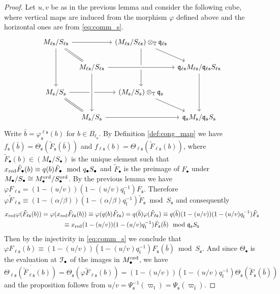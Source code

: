 \documentclass[leqno]{amsart}
\theoremstyle{definition}
\theoremstyle{remark}
\newcommand{\fl}{\mathfrak{l}}
\newcommand{\fq}{\mathfrak{q}}
\newcommand{\fs}{\mathfrak{s}}
\newcommand{\xx}{x_\textnormal{red}}
\newcommand{\TT}{\mathbb{T}} %
\newcommand{\euF}{\EuScript{F}} %
\newcommand{\ord}{\textnormal{ord}} %
\begin{document}
\begin{proof}

Let $u,v$ be as in the previous lemma 
and consider the following cube,
where vertical maps are induced from 
the morphism $\varphi$ defined above
and the horizontal ones are from \eqref{eq:comm_s}.
\begin{equation*}
\begin{tikzcd}[column sep=tiny]
M_{\ell\fs}/S_{\ell\fs}\arrow{dd} \arrow[rd,equal]\arrow[rr]
&& (M_{\ell\fs}/S_{\ell\fs})\otimes_{\TT}\fq_{\ell\fs}
	\arrow[rd]\arrow[dd]\\
& M_{\ell\fs}/S_{\ell\fs}
	\arrow[crossing over]{dd} \arrow[crossing over]{rr} 
&& \fq_{\ell\fs}M_{\ell\fs}/\fq_{\ell\fs}S_{\ell\fs}
	\arrow[crossing over]{dd}\\
M_{\fs}/S_{\fs}\arrow{rr}\arrow[rd,equal]
&& (M_{\fs}/S_{\fs})\otimes_{\TT} \fq_{\fs}
	\arrow[rd]\\
& M_{\fs}/S_{\fs} \arrow[crossing over]{rr} 
&& \fq_{\fs}M_{\fs}/\fq_{\fs}S_{\fs}
\arrow[from=2-2,to=4-2,crossing over]
\arrow[from=2-4,to=4-4,crossing over]
\end{tikzcd}
\end{equation*}
Write $\bar{b}=\varphi^{\ell\fs}_{\fs}(b)$
for $b\in B_{\ell_\fs}$.
By Definition \ref{def:cong_map} we have
$f_\fs(\bar{b})=\Theta_{\fs}(\tilde{F}_\fs(\bar{b}))$ and 
$f_{\ell\fs}(b)=\Theta_{\ell\fs}(\tilde{F}_{\ell\fs}(b))$,
where $\tilde{F}_\bullet(b)\in (M_\bullet/S_\bullet)$
is the unique element such that 
$\xx \tilde{F}_\bullet(b)\equiv 
q(b)\tilde{F}_\bullet\mod q_\bullet S_\bullet$
and $\tilde{F}_\bullet$ is the preimage 
of $F_\bullet$ under 
$M_\bullet/S_\bullet\cong M_\bullet^{\ord}/S_\bullet^{\ord}$.
By the previous lemma we have
$\varphi F_{\ell\fs}=
(1-(u/v))(1-(u/v)q_\fl^{-1})F_{\fs}$. Therefore
$\varphi\tilde{F}_{\ell\fs}\equiv
(1-(\alpha/\beta))(1-(\alpha/\beta)q_\fl^{-1})\tilde{F}_{\fs}
\bmod S_\fs$ and consequently 
\begin{multline*}
\xx\varphi(\tilde{F}_{\ell\fs}(b))=
\varphi(\xx \tilde{F}_{\ell\fs}(b))\equiv 
\varphi(q(b)\tilde{F}_{\ell\fs})=
q(\bar{b})\varphi(\tilde{F}_{\ell\fs}) \equiv 
q(\bar{b})(1-(u/v))(1-(u/v)q_\fl^{-1})
\tilde{F}_{\fs}\\\equiv
\xx(1-(u/v))(1-(u/v)q_\fl^{-1})
\tilde{F}_{\fs}(\bar{b})\mod \fq_\fs S_\fs
\end{multline*}
Then by the injectivity in \eqref{eq:comm_s} we conclude that
$\varphi F_{\ell\fs}(b)\equiv
(1-(u/v))(1-(u/v)q_\fl^{-1})
F_\fs(\bar{b})\bmod S_\fs$.
And since $\Theta_\bullet$ is the evaluation
at $\euF_\bullet$ of the images in $M_\bullet^{\ord}$,
we have
\[
    \overline{\Theta_{\ell\fs}(\tilde{F}_{\ell\fs}(b))}
    =\Theta_\fs(\varphi\tilde{F}_{\ell\fs}(b))=
    (1-(u/v))(1-(u/v)q_\fl^{-1})
    \Theta_\fs(\tilde{F}_\fs(\bar{b}))
\]
and the proposition follows from 
$u/v=\Psi_\fs^{-1}(\varpi_\fl)=\Psi_\fs(\varpi_{\bar{\fl}})$.
	
\end{proof}
\end{document}

